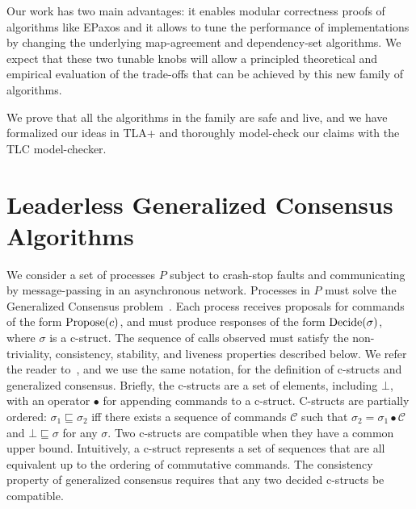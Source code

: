 Our work has two main advantages: it enables modular correctness proofs of algorithms like EPaxos and it allows to tune the performance of implementations by changing the underlying map-agreement and dependency-set algorithms. We expect that these two tunable knobs will allow a principled theoretical and empirical evaluation of the trade-offs that can be achieved by this new family of algorithms.

We prove that all the algorithms in the family are safe and live, and we have formalized our ideas in TLA+ and thoroughly model-check our claims with the TLC model-checker.

\section{Leaderless Generalized Consensus Algorithms}

We consider a set of processes $P$ subject to crash-stop faults and communicating by message-passing in an asynchronous network. Processes in $P$ must solve the Generalized Consensus problem~\cite{Lamport05GeneralizeConsensus}. Each process receives proposals for commands of the form $\operatorname{Propose}(c)$, and must produce responses of the form $\operatorname{Decide}(\sigma)$, where $\sigma$ is a c-struct. 
The sequence of calls observed must satisfy the non-triviality, consistency, stability, and liveness properties described below.
We refer the reader to~\cite{Lamport05GeneralizeConsensus}, and we use the same notation, for the definition of c-structs and generalized consensus. Briefly, the c-structs are a set of elements, including $\bot$, with an operator $\bullet$ for appending commands to a c-struct. C-structs are partially ordered: $\sigma_1\sqsubseteq \sigma_2$ iff there exists a sequence of commands $\mathcal{C}$ such that $\sigma_2 = \sigma_1\bullet \mathcal{C}$ and $\bot\sqsubseteq \sigma$ for any
$\sigma$. Two c-structs are compatible when they have a
common upper bound. Intuitively, a c-struct represents a set of sequences that are all equivalent up to the ordering of commutative commands. The consistency property of generalized consensus requires that any two decided c-structs be compatible.

